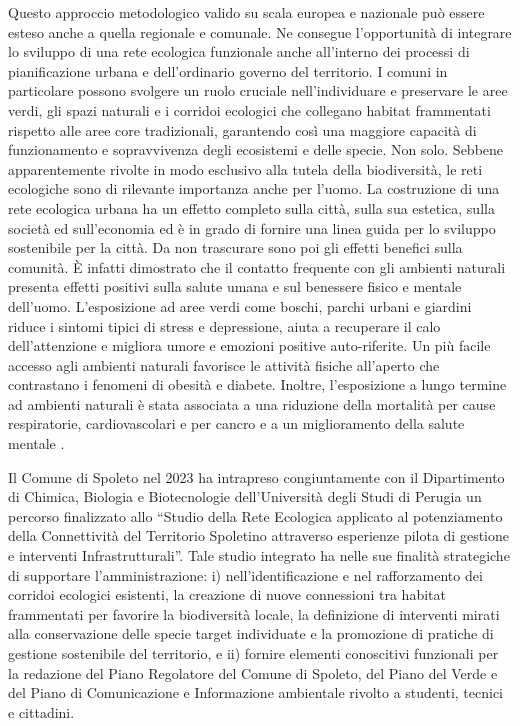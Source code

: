 \documentclass[
]{book}
\begin{document}
Questo approccio metodologico valido su scala europea e nazionale può essere esteso anche a quella regionale e comunale. Ne consegue l'opportunità di integrare lo sviluppo di una rete ecologica funzionale anche all'interno dei processi di pianificazione urbana e dell'ordinario governo del territorio. I comuni in particolare possono svolgere un ruolo cruciale nell'individuare e preservare le aree verdi, gli spazi naturali e i corridoi ecologici che collegano habitat frammentati rispetto alle aree core tradizionali, garantendo così una maggiore capacità di funzionamento e sopravvivenza degli ecosistemi e delle specie. Non solo. Sebbene apparentemente rivolte in modo esclusivo alla tutela della biodiversità, le reti ecologiche sono di rilevante importanza anche per l'uomo. La costruzione di una rete ecologica urbana ha un effetto completo sulla città, sulla sua estetica, sulla società ed sull'economia ed è in grado di fornire una linea guida per lo sviluppo sostenibile per la città. Da non trascurare sono poi gli effetti benefici sulla comunità. È infatti dimostrato che il contatto frequente con gli ambienti naturali presenta effetti positivi sulla salute umana e sul benessere fisico e mentale dell'uomo. L'esposizione ad aree verdi come boschi, parchi urbani e giardini riduce i sintomi tipici di stress e depressione, aiuta a recuperare il calo dell'attenzione e migliora umore e emozioni positive auto-riferite. Un più facile accesso agli ambienti naturali favorisce le attività fisiche all'aperto che contrastano i fenomeni di obesità e diabete. Inoltre, l'esposizione a lungo termine ad ambienti naturali è stata associata a una riduzione della mortalità per cause respiratorie, cardiovascolari e per cancro e a un miglioramento della salute mentale \citep{aerts2018}.

Il Comune di Spoleto nel 2023 ha intrapreso congiuntamente con il Dipartimento di Chimica, Biologia e Biotecnologie dell'Università degli Studi di Perugia un percorso finalizzato allo ``Studio della Rete Ecologica applicato al potenziamento della Connettività del Territorio Spoletino attraverso esperienze pilota di gestione e interventi Infrastrutturali''. Tale studio integrato ha nelle sue finalità strategiche di supportare l'amministrazione: i) nell'identificazione e nel rafforzamento dei corridoi ecologici esistenti, la creazione di nuove connessioni tra habitat frammentati per favorire la biodiversità locale, la definizione di interventi mirati alla conservazione delle specie target individuate e la promozione di pratiche di gestione sostenibile del territorio, e ii) fornire elementi conoscitivi funzionali per la redazione del Piano Regolatore del Comune di Spoleto, del Piano del Verde e del Piano di Comunicazione e Informazione ambientale rivolto a studenti, tecnici e cittadini.
\end{document}

